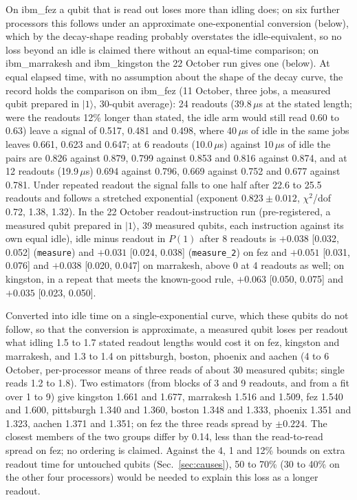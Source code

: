 \documentclass[reprint,amsmath,amssymb,aps,superscriptaddress,nofootinbib]{revtex4-2}
\newcommand{\us}{\,$\mu$s}
\begin{document}
On ibm\_fez a qubit that is read out loses more than idling does; on six further processors this follows under an approximate one-exponential conversion (below), which by the decay-shape reading probably overstates the idle-equivalent, so no loss beyond an idle is claimed there without an equal-time comparison; on ibm\_marrakesh and ibm\_kingston the 22 October run gives one (below). At equal elapsed time, with no assumption about the shape of the decay curve, the record holds the comparison on ibm\_fez (11 October, three jobs, a measured qubit prepared in $|1\rangle$, 30-qubit average): 24 readouts (39.8\us{} at the stated length; were the readouts 12\% longer than stated, the idle arm would still read 0.60 to 0.63) leave a signal of 0.517, 0.481 and 0.498, where 40\us{} of idle in the same jobs leaves 0.661, 0.623 and 0.647; at 6 readouts (10.0\us) against 10\us{} of idle the pairs are 0.826 against 0.879, 0.799 against 0.853 and 0.816 against 0.874, and at 12 readouts (19.9\us) 0.694 against 0.796, 0.669 against 0.752 and 0.677 against 0.781. Under repeated readout the signal falls to one half after 22.6 to 25.5 readouts and follows a stretched exponential (exponent $0.823\pm0.012$, $\chi^2$/dof 0.72, 1.38, 1.32). In the 22 October readout-instruction run (pre-registered, a measured qubit prepared in $|1\rangle$, 39 measured qubits, each instruction against its own equal idle), idle minus readout in $P(1)$ after 8 readouts is $+0.038$ [0.032, 0.052] (\texttt{measure}) and $+0.031$ [0.024, 0.038] (\texttt{measure\_2}) on fez and $+0.051$ [0.031, 0.076] and $+0.038$ [0.020, 0.047] on marrakesh, above 0 at 4 readouts as well; on kingston, in a repeat that meets the known-good rule, $+0.063$ [0.050, 0.075] and $+0.035$ [0.023, 0.050].

Converted into idle time on a single-exponential curve, which these qubits do not follow, so that the conversion is approximate, a measured qubit loses per readout what idling 1.5 to 1.7 stated readout lengths would cost it on fez, kingston and marrakesh, and 1.3 to 1.4 on pittsburgh, boston, phoenix and aachen (4 to 6 October, per-processor means of three reads of about 30 measured qubits; single reads 1.2 to 1.8). Two estimators (from blocks of 3 and 9 readouts, and from a fit over 1 to 9) give kingston 1.661 and 1.677, marrakesh 1.516 and 1.509, fez 1.540 and 1.600, pittsburgh 1.340 and 1.360, boston 1.348 and 1.333, phoenix 1.351 and 1.323, aachen 1.371 and 1.351; on fez the three reads spread by $\pm0.224$. The closest members of the two groups differ by 0.14, less than the read-to-read spread on fez; no ordering is claimed. Against the 4, 1 and 12\% bounds on extra readout time for untouched qubits (Sec.~\ref{sec:causes}), 50 to 70\% (30 to 40\% on the other four processors) would be needed to explain this loss as a longer readout.
\end{document}
